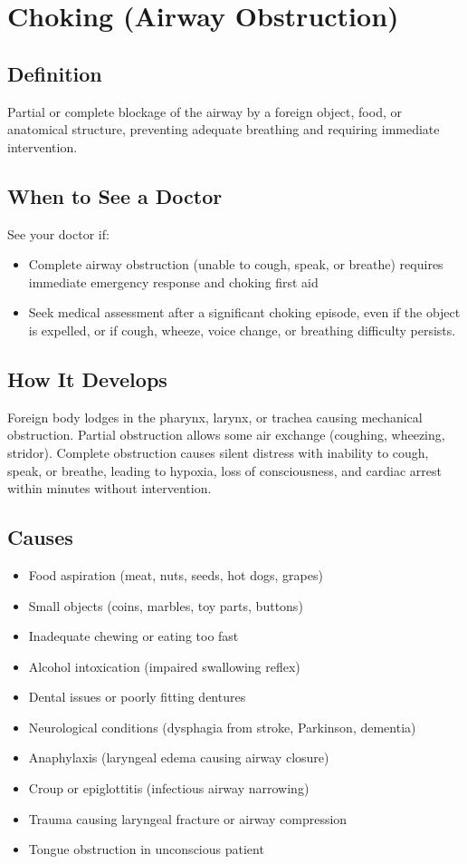 \chapter{Choking (Airway Obstruction)}

\section*{Definition}
Partial or complete blockage of the airway by a foreign object, food, or anatomical structure, preventing adequate breathing and requiring immediate intervention.

\section*{When to See a Doctor}
See your doctor if:
\begin{itemize}
   \item Complete airway obstruction (unable to cough, speak, or breathe) requires immediate emergency response and choking first aid
   \item Seek medical assessment after a significant choking episode, even if the object is expelled, or if cough, wheeze, voice change, or breathing difficulty persists.
\end{itemize}

\section*{How It Develops}
Foreign body lodges in the pharynx, larynx, or trachea causing mechanical obstruction. Partial obstruction allows some air exchange (coughing, wheezing, stridor). Complete obstruction causes silent distress with inability to cough, speak, or breathe, leading to hypoxia, loss of consciousness, and cardiac arrest within minutes without intervention.

\section*{Causes}
\begin{itemize}
  \item Food aspiration (meat, nuts, seeds, hot dogs, grapes)
  \item Small objects (coins, marbles, toy parts, buttons)
  \item Inadequate chewing or eating too fast
  \item Alcohol intoxication (impaired swallowing reflex)
  \item Dental issues or poorly fitting dentures
  \item Neurological conditions (dysphagia from stroke, Parkinson, dementia)
  \item Anaphylaxis (laryngeal edema causing airway closure)
  \item Croup or epiglottitis (infectious airway narrowing)
  \item Trauma causing laryngeal fracture or airway compression
  \item Tongue obstruction in unconscious patient
\end{itemize}

